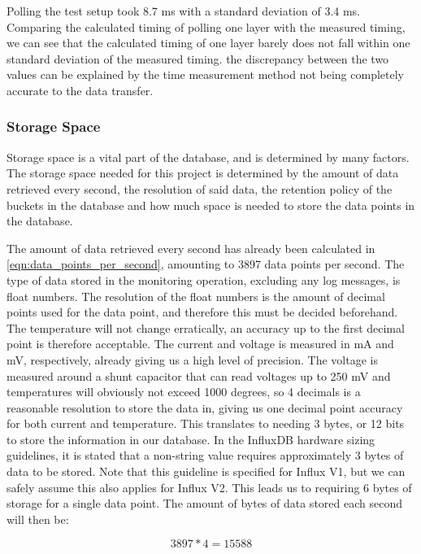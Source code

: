 \documentclass[main.tex]{subfiles}
\begin{document}
Polling the test setup took 8.7 ms with a standard deviation of 3.4 ms. Comparing the calculated timing of polling one layer with the measured timing, we can see that the calculated timing of one layer barely does not fall within one standard deviation of the measured timing. the discrepancy between the two values can be explained by the time measurement method not being completely accurate to the data transfer. 

\subsubsection{Storage Space}
Storage space is a vital part of the database, and is determined by many factors. The storage space needed for this project is determined by the amount of data retrieved every second, the resolution of said data, the retention policy of the buckets in the database and how much space is needed to store the data points in the database.

The amount of data retrieved every second has already been calculated in \autoref{eqn:data_points_per_second}, amounting to 3897 data points per second. The type of data stored in the monitoring operation, excluding any log messages, is float numbers. The resolution of the float numbers is the amount of decimal points used for the data point, and therefore this must be decided beforehand. The temperature will not change erratically, an accuracy up to the first decimal point is therefore acceptable. The current and voltage is measured in mA and mV, respectively, already giving us a high level of precision. The voltage is measured around a shunt capacitor that can read voltages up to 250 mV and temperatures will obviously not exceed 1000 degrees, so 4 decimals is a reasonable resolution to store the data in, giving us one decimal point accuracy for both current and temperature. This translates to needing 3 bytes, or 12 bits to store the information in our database. In the InfluxDB hardware sizing guidelines, it is stated that a non-string value requires approximately 3 bytes of data to be stored\cite{influx_sizing}. Note that this guideline is specified for Influx V1, but we can safely assume this also applies for Influx V2. This leads us to requiring 6 bytes of storage for a single data point. The amount of bytes of data stored each second will then be: 

\begin{equation} \label{eqn:total_bytes_per_second}
3897*4 = 15588 
\end{equation}
\end{document}

